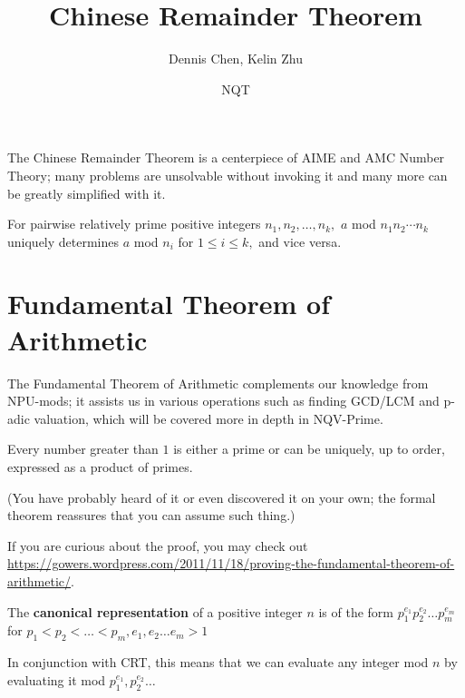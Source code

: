 \documentclass[mast]{lucky}
\title{Chinese Remainder Theorem}
\author{Dennis Chen, Kelin Zhu}
\date{NQT}
\begin{document}
\maketitle

The Chinese Remainder Theorem is a centerpiece of AIME and AMC Number Theory; many problems are unsolvable without invoking it and many more can be greatly simplified with it.

\begin{theo}
For pairwise relatively prime positive integers $n_1,n_2,\ldots,n_k,$ $a$ mod $n_1n_2\cdots n_k$ uniquely determines $a$ mod $n_i$ for $1\leq i\leq k,$ and vice versa.
\end{theo}

\section{Fundamental Theorem of Arithmetic}
The Fundamental Theorem of Arithmetic complements our knowledge from NPU-mods; it assists us in various operations such as finding GCD/LCM and p-adic valuation, which will be covered more in depth in NQV-Prime.
\begin{theo}
Every number greater than $1$ is either a prime or can be uniquely, up to order, expressed as a product of primes.

(You have probably heard of it or even discovered it on your own; the formal theorem reassures that you can assume such thing.)
\end{theo}

If you are curious about the proof, you may check out \url{https://gowers.wordpress.com/2011/11/18/proving-the-fundamental-theorem-of-arithmetic/}.

\begin{fact}
The \textbf{canonical representation} of a positive integer $n$ is of the form $p_1^{e_1}p_2^{e_2}\ldots p_m^{e_m}$ for $p_1<p_2<\ldots <p_m, e_1,e_2\ldots e_m>1$ 
\end{fact}

In conjunction with CRT, this means that we can evaluate any integer mod $n$ by evaluating it mod $p_1^{e_1},p_2^{e_2}\ldots$
\end{document}
